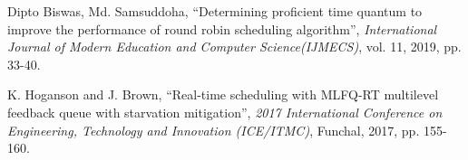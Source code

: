 \documentclass[conference]{IEEEtran}
\begin{document}
\begin{thebibliography}{00}
 Dipto Biswas, Md. Samsuddoha, ``Determining proficient time quantum to  improve the performance  of  round  robin  scheduling  algorithm'', \textit{International  Journal  of  Modern  Education  and  Computer Science(IJMECS)}, vol. 11, 2019, pp. 33-40.

 K. Hoganson and J. Brown, ``Real-time scheduling with MLFQ-RT multilevel feedback queue with starvation mitigation'', \textit{2017 International Conference on Engineering, Technology and Innovation (ICE/ITMC)}, Funchal, 2017, pp. 155-160.

\end{thebibliography}
\end{document}
